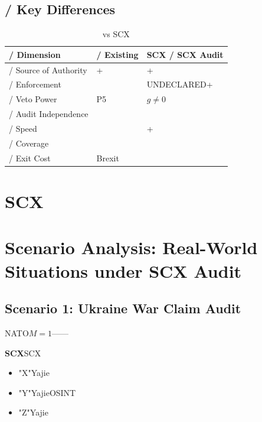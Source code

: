 \documentclass[12pt,a4paper]{article}
\theoremstyle{remark}
\begin{document}
\subsection{ / Key Differences}

\begin{table}[H]
\centering
\begin{tabular}{p{3cm} p{5.5cm} p{5.5cm}}
    \toprule
    \textbf{ / Dimension} & \textbf{ / Existing} & \textbf{SCX / SCX Audit} \\
    \midrule
     / Source of Authority & + & + \\
    \midrule
     / Enforcement &  & UNDECLARED+ \\
    \midrule
     / Veto Power & P5 & $g \neq 0$ \\
    \midrule
     / Audit Independence &  &  \\
    \midrule
     / Speed &  & + \\
    \midrule
     / Coverage &  &  \\
    \midrule
     / Exit Cost & Brexit &  \\
    \bottomrule
\end{tabular}
\caption{ vs SCX}
\end{table}


\section{SCX}
\section{Scenario Analysis: Real-World Situations under SCX Audit}

\subsection{}
\subsection{Scenario 1: Ukraine War Claim Audit}

\textbf{}NATO$M=1$——\textbf{}

\textbf{SCX}SCX

\begin{itemize}[nosep]
    \item \textbf{}"X"Yajie
    \item \textbf{}"Y"YajieOSINT
    \item \textbf{}"Z"Yajie
\end{itemize}
\end{document}
